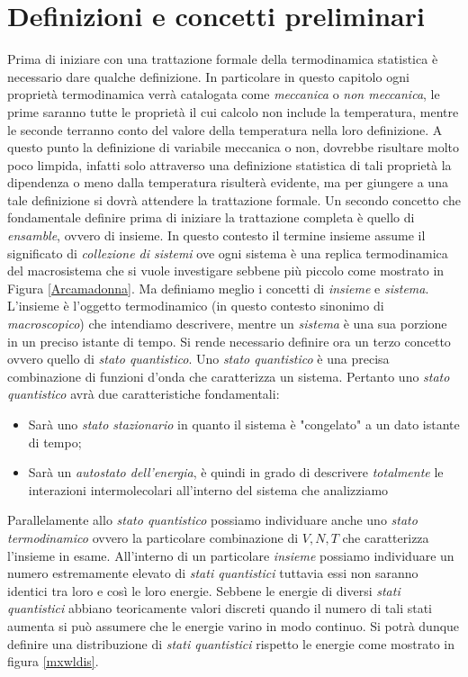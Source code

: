\documentclass[oneside]{amsbook}
\numberwithin{section}{chapter}
\numberwithin{equation}{section}
\numberwithin{figure}{section}
\begin{document}
\section{Definizioni e concetti preliminari}
Prima di iniziare con una trattazione formale della termodinamica statistica è necessario dare qualche definizione.
In particolare in questo capitolo ogni proprietà termodinamica verrà catalogata come \emph{meccanica} o \emph{non meccanica}, le prime saranno tutte le proprietà il cui calcolo non include la temperatura, mentre le seconde terranno conto del valore della temperatura nella loro definizione. A questo punto la definizione di variabile meccanica o non, dovrebbe risultare molto poco limpida, infatti solo attraverso una definizione statistica di tali proprietà la dipendenza o meno dalla temperatura risulterà evidente, ma per giungere a una tale definizione si dovrà attendere la trattazione formale.
Un secondo concetto che fondamentale definire prima di iniziare la trattazione completa è quello di \emph{ensamble}, ovvero di insieme. In questo contesto il termine insieme assume il significato di \emph{collezione di sistemi} ove ogni sistema è una replica termodinamica del macrosistema che si vuole investigare sebbene più piccolo come mostrato in Figura \ref{Arcamadonna}.
Ma definiamo meglio i concetti di \emph{insieme} e \emph{sistema}. L'insieme è l'oggetto termodinamico (in questo contesto sinonimo di \emph{macroscopico}) che intendiamo descrivere, mentre un \emph{sistema} è una sua porzione in un preciso istante di tempo. Si rende necessario definire ora un terzo concetto ovvero quello di \emph{stato quantistico}. Uno \emph{stato quantistico} è una precisa combinazione di funzioni d'onda che caratterizza un sistema. Pertanto uno \emph{stato quantistico} avrà due caratteristiche fondamentali:
\begin{itemize}
\item Sarà uno \emph{stato stazionario} in quanto il sistema è "congelato" a un dato istante di tempo;
\item Sarà un \emph{autostato dell'energia}, è quindi in grado di descrivere \emph{totalmente } le interazioni intermolecolari all'interno del sistema che analizziamo
\end{itemize}
Parallelamente allo \emph{stato quantistico} possiamo individuare anche uno \emph{stato termodinamico} ovvero la particolare combinazione di $V,N,T$ che caratterizza l'insieme in esame. All'interno di un particolare \emph{insieme} possiamo individuare un numero estremamente elevato di \emph{stati quantistici} tuttavia essi non saranno identici tra loro e così le loro energie. Sebbene le energie di diversi \emph{stati quantistici} abbiano teoricamente valori discreti quando il numero di tali stati aumenta si può assumere che le energie varino in modo continuo. Si potrà dunque definire una distribuzione di \emph{stati quantistici} rispetto le energie come mostrato in figura \ref{mxwldis}.
\end{document}
